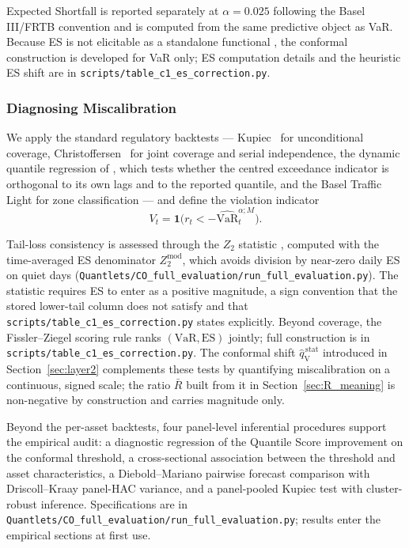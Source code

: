 \documentclass[preprint,11pt,authoryear]{elsarticle}
\newcommand{\VaR}{\mathrm{VaR}}
\newcommand{\ES}{\mathrm{ES}}
\newcommand{\1}{\boldsymbol{1}}
\newcommand{\qVstat}{\hat{q}_{\scriptscriptstyle\mathrm{V}}^{\,\mathrm{stat}}}
\begin{document}
Expected Shortfall is reported separately at $\alpha = 0.025$ following the Basel III/FRTB convention \citep{bcbs2019frtb} and is computed from the same predictive object as VaR. Because ES is not elicitable as a standalone functional \citep{gneiting2011making}, the conformal construction is developed for VaR only; ES computation details and the heuristic ES shift are in \texttt{scripts/table\_c1\_es\_correction.py}.

\subsubsection{Diagnosing Miscalibration}
\label{sec:diag}

We apply the standard regulatory backtests --- Kupiec~\citep{kupiec1995} for unconditional coverage, Christoffersen~\citep{christoffersen1998} for joint coverage and serial independence, the dynamic quantile regression of \citet{engle2004caviar}, which tests whether the centred exceedance indicator is orthogonal to its own lags and to the reported quantile, and the Basel Traffic Light \citep{basel1996} for zone classification --- and define the violation indicator
\begin{equation}
	V_t = \mathbf{1}\bigl(r_t < -\widehat{\VaR}_t^{\alpha;M}\bigr).
\end{equation}

Tail-loss consistency is assessed through the $Z_2$ statistic \citep{acerbi2014back}, computed with the time-averaged ES denominator $Z_2^{\mathrm{mod}}$, which avoids division by near-zero daily ES on quiet days (\texttt{Quantlets/CO\_full\_evaluation/run\_full\_evaluation.py}). The statistic requires ES to enter as a positive magnitude, a sign convention that the stored lower-tail column does not satisfy and that \texttt{scripts/table\_c1\_es\_correction.py} states explicitly. Beyond coverage, the Fissler--Ziegel scoring rule \citep{fissler2016higher} ranks $(\VaR, \ES)$ jointly; full construction is in \texttt{scripts/table\_c1\_es\_correction.py}. The conformal shift $\qVstat$ introduced in Section~\ref{sec:layer2} complements these tests by quantifying miscalibration on a continuous, signed scale; the ratio $\bar R$ built from it in Section~\ref{sec:R_meaning} is non-negative by construction and carries magnitude only.

Beyond the per-asset backtests, four panel-level inferential procedures support the empirical audit: a diagnostic regression of the Quantile Score improvement on the conformal threshold, a cross-sectional association between the threshold and asset characteristics, a Diebold--Mariano pairwise forecast comparison \citep{diebold1995comparing} with Driscoll--Kraay panel-HAC \citep{driscoll1998consistent} variance, and a panel-pooled Kupiec test with cluster-robust inference. Specifications are in \texttt{Quantlets/CO\_full\_evaluation/run\_full\_evaluation.py}; results enter the empirical sections at first use.
\end{document}
